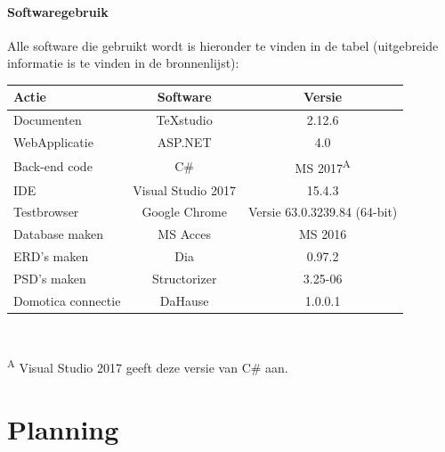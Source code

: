 \documentclass[11pt]{article}
\begin{document}
\paragraph{Softwaregebruik}
\begin{flushleft}
	Alle software die gebruikt wordt is hieronder te vinden in de tabel (uitgebreide informatie is te vinden in de bronnenlijst):\\
	\begin{tabular}[h]{l c c}
		Actie & Software & Versie\\ \hline
		Documenten & TeXstudio & 2.12.6\\ \hline 
		WebApplicatie & ASP.NET & 4.0\\ \hline
		Back-end code & C\# &  MS 2017\textsuperscript{A} \\ \hline
		IDE & Visual Studio 2017 & 15.4.3\\ \hline
		Testbrowser & Google Chrome & Versie 63.0.3239.84 (64-bit)\\ \hline
		Database maken & MS Acces & MS 2016\\ \hline
		ERD's maken & Dia & 0.97.2\\ \hline
		PSD's maken & Structorizer & 3.25-06\\ \hline
		Domotica connectie & DaHause & 1.0.0.1 \\ \hline
		
	\end{tabular}\\ 
	\vspace{4mm}
	
	\textsuperscript{A} Visual Studio 2017 geeft deze versie van C\# aan.
\end{flushleft}
\newpage

\section{Planning}
\end{document}
